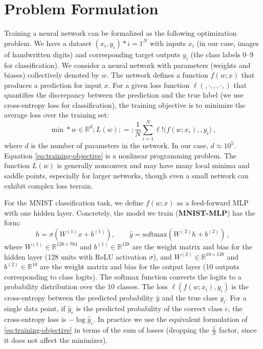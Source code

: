 \documentclass[12pt]{article}
\begin{document}
\section{Problem Formulation} \label{formulation}
Training a neural network can be formalized as the following optimization problem. We have a dataset ${(x_i, y_i)}*{i=1}^N$ with inputs $x_i$ (in our case, images of handwritten digits) and corresponding target outputs $y_i$ (the class labels 0–9 for classification). We consider a neural network with parameters (weights and biases) collectively denoted by $w$. The network defines a function $f(w; x)$ that produces a prediction for input $x$. For a given loss function $\ell(,\cdot,,,\cdot,)$ that quantifies the discrepancy between the prediction and the true label (we use cross-entropy loss for classification), the training objective is to minimize the average loss over the training set:
\begin{equation}\label{eq:training-objective}
\min*{w \in \mathbb{R}^d} ; L(w) ;=; \frac{1}{N}\sum_{i=1}^N \ell!\big(f(w; x_i),, y_i\big)~,
\end{equation}
where $d$ is the number of parameters in the network. In our case, $d \approx 10^5$. Equation \eqref{eq:training-objective} is a nonlinear programming problem. The function $L(w)$ is generally nonconvex and may have many local minima and saddle points, especially for larger networks, though even a small network can exhibit complex loss terrain.

For the MNIST classification task, we define $f(w; x)$ as a feed-forward MLP with one hidden layer. Concretely, the model we train (\textbf{MNIST-MLP}) has the form:
\begin{equation}\label{eq:network-def}
h = \sigma(W^{(1)} x + b^{(1)}), \qquad \hat{y} = \mathrm{softmax}(W^{(2)} h + b^{(2)})~,
\end{equation}
where $W^{(1)} \in \mathbb{R}^{128 \times 784}$ and $b^{(1)} \in \mathbb{R}^{128}$ are the weight matrix and bias for the hidden layer (128 units with ReLU activation $\sigma$), and $W^{(2)} \in \mathbb{R}^{10 \times 128}$ and $b^{(2)} \in \mathbb{R}^{10}$ are the weight matrix and bias for the output layer (10 outputs corresponding to class logits). The softmax function converts the logits to a probability distribution over the 10 classes. The loss $\ell(f(w;x_i), y_i)$ is the cross-entropy between the predicted probability $\hat{y}$ and the true class $y_i$. For a single data point, if $\hat{y}_c$ is the predicted probability of the correct class $c$, the cross-entropy loss is $-\log \hat{y}_c$. In practice we use the equivalent formulation of \eqref{eq:training-objective} in terms of the sum of losses (dropping the $\frac{1}{N}$ factor, since it does not affect the minimizer).
\end{document}
